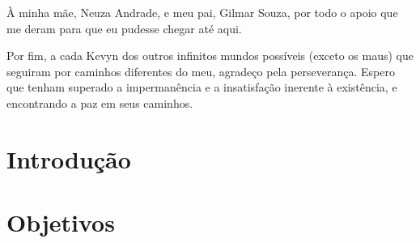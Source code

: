 \documentclass[12pt, a4paper, twoside]{article}
\numberwithin{equation}{subsection} %
\begin{document}
À minha mãe, Neuza Andrade, e meu pai, Gilmar Souza, por todo o apoio que me deram para que eu pudesse chegar até aqui.

Por fim, a cada Kevyn dos outros infinitos mundos possíveis (exceto os maus) que seguiram por caminhos diferentes do meu, agradeço pela perseverança. Espero que tenham superado a impermanência e a insatisfação inerente à existência, e encontrando a paz em seus caminhos.

\newpage


%
%
%

  
\newpage



\listoftables

\newpage

\listoffigures

\newpage

\listofmodelo

\newpage
\tableofcontents

\newpage

\setcounter{page}{8}

\section{\textbf{Introdução}}


\newpage

\section{\textbf{Objetivos}}

\end{document}
